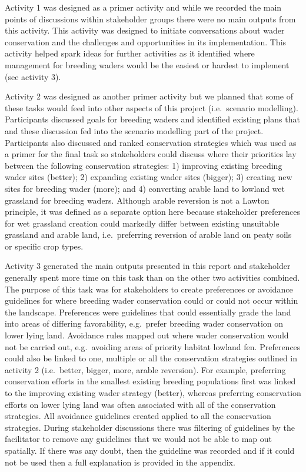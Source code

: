 \documentclass[
  12pt,
  letterpaper,
  DIV=11,
  numbers=noendperiod]{scrartcl}
\begin{document}
Activity 1 was designed as a primer activity and while we recorded the
main points of discussions within stakeholder groups there were no main
outputs from this activity. This activity was designed to initiate
conversations about wader conservation and the challenges and
opportunities in its implementation. This activity helped spark ideas
for further activities as it identified where management for breeding
waders would be the easiest or hardest to implement (see activity 3).

Activity 2 was designed as another primer activity but we planned that
some of these tasks would feed into other aspects of this project
(i.e.~scenario modelling). Participants discussed goals for breeding
waders and identified existing plans that and these discussion fed into
the scenario modelling part of the project. Participants also discussed
and ranked conservation strategies which was used as a primer for the
final task so stakeholders could discuss where their priorities lay
between the following conservation strategies: 1) improving existing
breeding wader sites (better); 2) expanding existing wader sites
(bigger); 3) creating new sites for breeding wader (more); and 4)
converting arable land to lowland wet grassland for breeding waders.
Although arable reversion is not a Lawton principle, it was defined as a
separate option here because stakeholder preferences for wet grassland
creation could markedly differ between existing unsuitable grassland and
arable land, i.e.~preferring reversion of arable land on peaty soils or
specific crop types.

Activity 3 generated the main outputs presented in this report and
stakeholder generally spent more time on this task than on the other two
activities combined. The purpose of this task was for stakeholders to
create preferences or avoidance guidelines for where breeding wader
conservation could or could not occur within the landscape. Preferences
were guidelines that could essentially grade the land into areas of
differing favorability, e.g.~prefer breeding wader conservation on lower
lying land. Avoidance rules mapped out where wader conservation would
not be carried out, e.g.~avoiding areas of priority habitat lowland fen.
Preferences could also be linked to one, multiple or all the
conservation strategies outlined in activity 2 (i.e.~better, bigger,
more, arable reversion). For example, preferring conservation efforts in
the smallest existing breeding populations first was linked to the
improving existing wader strategy (better), whereas preferring
conservation efforts on lower lying land was often associated with all
of the conservation strategies. All avoidance guidelines created applied
to all the conservation strategies. During stakeholder discussions there
was filtering of guidelines by the facilitator to remove any guidelines
that we would not be able to map out spatially. If there was any doubt,
then the guideline was recorded and if it could not be used then a full
explanation is provided in the appendix.
\end{document}
